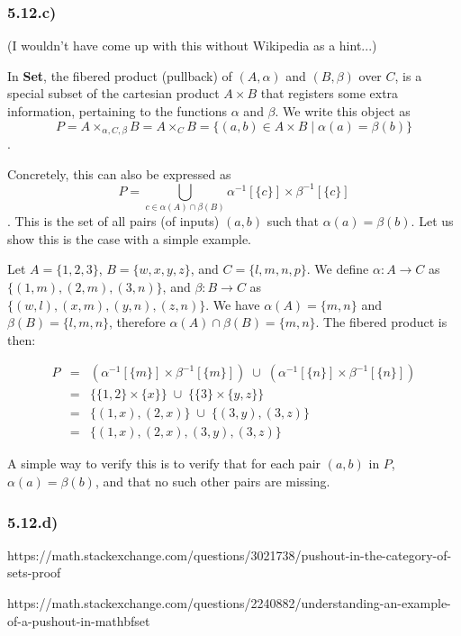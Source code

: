 \documentclass[12pt, letterpaper, twoside]{report}
\begin{document}
\subsubsection*{5.12.c)}

(I wouldn't have come up with this without Wikipedia as a hint...)

In \textbf{Set}, the fibered product (pullback) of $(A, \alpha)$ and $(B, \beta)$ over $C$, is a special subset of the cartesian product $A \times B$ that registers some extra information, pertaining to the functions $\alpha$ and $\beta$. We write this object as $$P = A \times_{\alpha, C, \beta} B = A \times_C B = \{ (a,b) \in A \times B \mid \alpha(a) = \beta(b) \}$$.

Concretely, this can also be expressed as $$P = \bigcup_{c \in \alpha(A) \cap \beta(B)} \alpha^{-1}[\{c\}] \times \beta^{-1}[\{c\}]$$. This is the set of all pairs (of inputs) $(a,b)$ such that $\alpha(a) = \beta(b)$. Let us show this is the case with a simple example.

Let $A = \{1,2,3\}$, $B = \{w, x, y, z\}$, and $C = \{l, m, n, p\}$. We define $\alpha : A \to C$ as $\{(1, m), (2, m), (3, n) \}$, and $\beta : B \to C$ as $\{ (w, l), (x, m), (y, n), (z, n) \}$. We have $\alpha(A) = \{m,n\}$ and $\beta(B) = \{l, m, n\}$, therefore $\alpha(A) \cap \beta(B) = \{m,n\}$. The fibered product is then:

$$
\begin{array}{lll}
P &=& (\alpha^{-1}[\{m\}] \times \beta^{-1}[\{m\}]) \; \cup \; (\alpha^{-1}[\{n\}] \times \beta^{-1}[\{n\}]) \\
  &=& \{ \{1,2\} \times \{x\} \} \; \cup \; \{ \{3\} \times \{y,z\} \} \\
  &=& \{ (1,x), (2,x) \} \; \cup \; \{ (3,y), (3,z) \} \\
  &=& \{ (1,x), (2,x), (3,y), (3,z) \}
\end{array}
$$

A simple way to verify this is to verify that for each pair $(a,b)$ in $P$, $\alpha(a) = \beta(b)$, and that no such other pairs are missing.


\subsubsection*{5.12.d)}

https://math.stackexchange.com/questions/3021738/pushout-in-the-category-of-sets-proof

https://math.stackexchange.com/questions/2240882/understanding-an-example-of-a-pushout-in-mathbfset
\end{document}
